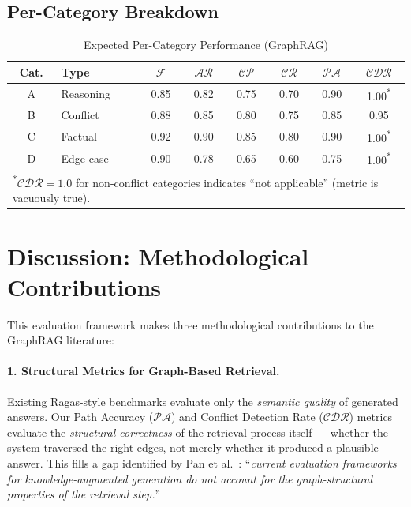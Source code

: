 \subsection{Per-Category Breakdown}

\begin{table}[htbp]
\centering
\caption{Expected Per-Category Performance (GraphRAG)}
\label{tab:per-category}
\begin{tabular}{clcccccc}
\toprule
\textbf{Cat.} & \textbf{Type} & $\mathcal{F}$ & $\mathcal{AR}$ & $\mathcal{CP}$ & $\mathcal{CR}$ & $\mathcal{PA}$ & $\mathcal{CDR}$ \\
\midrule
A & Reasoning   & 0.85 & 0.82 & 0.75 & 0.70 & 0.90 & 1.00\textsuperscript{*} \\
B & Conflict    & 0.88 & 0.85 & 0.80 & 0.75 & 0.85 & 0.95 \\
C & Factual     & 0.92 & 0.90 & 0.85 & 0.80 & 0.90 & 1.00\textsuperscript{*} \\
D & Edge-case   & 0.90 & 0.78 & 0.65 & 0.60 & 0.75 & 1.00\textsuperscript{*} \\
\bottomrule
\multicolumn{8}{l}{\textsuperscript{*}\footnotesize{$\mathcal{CDR} = 1.0$ for non-conflict categories indicates ``not applicable'' (metric is vacuously true).}}
\end{tabular}
\end{table}


\section{Discussion: Methodological Contributions}
\label{sec:discussion}

This evaluation framework makes three methodological contributions to the GraphRAG literature:

\paragraph{1. Structural Metrics for Graph-Based Retrieval.}
Existing Ragas-style benchmarks evaluate only the \textit{semantic quality} of generated answers. Our Path Accuracy ($\mathcal{PA}$) and Conflict Detection Rate ($\mathcal{CDR}$) metrics evaluate the \textit{structural correctness} of the retrieval process itself — whether the system traversed the right edges, not merely whether it produced a plausible answer. This fills a gap identified by Pan et al.~\cite{pan2024unifying}: ``\textit{current evaluation frameworks for knowledge-augmented generation do not account for the graph-structural properties of the retrieval step.}''

